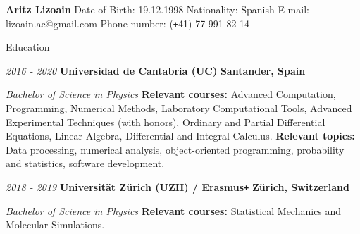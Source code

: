 \documentclass{resume} %
\def\Plus{\texttt{+}}
\begin{document}
\vspace{-0.85in}
\textbf{Aritz Lizoain} \newline
Date of Birth: 19.12.1998 \newline
Nationality: Spanish \newline
E-mail: lizoain.ac@gmail.com \newline
Phone number: (\Plus 41) 77 991 82 14
\vspace{-25pt}


\vspace{20pt}
\begin{rSection}{{\large Education}}
\begin{adjustwidth}{-6mm}{0pt}
\small{\em{2016 - 2020}} \normalsize \hspace{5pt} {\bf Universidad de Cantabria (UC)} \hfill {\bf Santander, Spain}
\end{adjustwidth}
\vspace{-7pt}
\begin{adjustwidth}{15mm}{0pt}\textit{Bachelor of Science in Physics}\newline
{\bf Relevant courses: }Advanced Computation, Programming, Numerical Methods, Laboratory Computational Tools, Advanced Experimental Techniques (with honors), Ordinary and Partial Differential Equations, Linear Algebra, Differential and Integral Calculus.
\newline
{\bf Relevant topics: }Data processing, numerical analysis, object-oriented programming, probability and statistics, software development.
\end{adjustwidth}

\begin{adjustwidth}{-6mm}{0pt}
\small{\em{2018 - 2019}} \normalsize \hspace{5pt} {\bf Universit{\"a}t Z{\"u}rich (UZH) / Erasmus\Plus} \hfill {\bf Z{\"u}rich, Switzerland}
\end{adjustwidth}
\vspace{-7pt}
\begin{adjustwidth}{15mm}{0pt}\textit{Bachelor of Science in Physics}\newline
{\bf Relevant courses: }Statistical Mechanics and Molecular Simulations.
\end{adjustwidth}
\end{rSection}
\vspace{-0pt}
\end{document}
